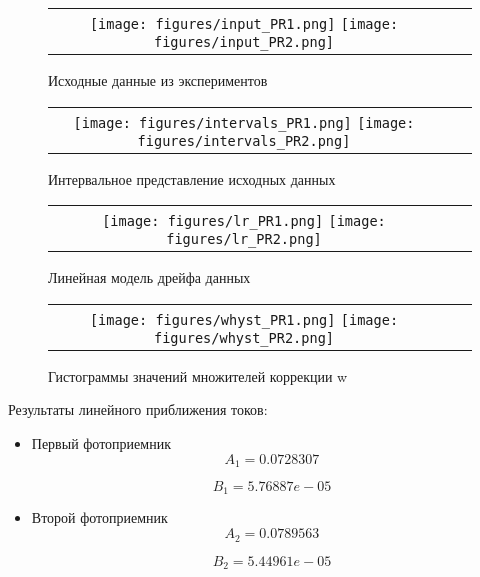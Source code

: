 \documentclass[../main.tex]{subfiles}
\begin{document}
\begin{figure}[H]
	\begin{tabular}{ccc}
		\texttt{[image: figures/input\_PR1.png]}
		\texttt{[image: figures/input\_PR2.png]}
	\end{tabular}
	\caption{Исходные данные из экспериментов} 
\end{figure}

\begin{figure}[H]
	\begin{tabular}{ccc}
		\texttt{[image: figures/intervals\_PR1.png]}
		\texttt{[image: figures/intervals\_PR2.png]}
	\end{tabular}
	\caption{Интервальное представление исходных данных} 
\end{figure}

\begin{figure}[H]
	\begin{tabular}{ccc}
		\texttt{[image: figures/lr\_PR1.png]}
		\texttt{[image: figures/lr\_PR2.png]}
	\end{tabular}
	\caption{Линейная модель дрейфа данных} 
\end{figure}

\begin{figure}[H]
	\begin{tabular}{ccc}
		\texttt{[image: figures/whyst\_PR1.png]}
		\texttt{[image: figures/whyst\_PR2.png]}
	\end{tabular}
	\caption{Гистограммы значений множителей коррекции w} 
\end{figure}

Результаты линейного приближения токов:
\begin{itemize}
\item Первый фотоприемник
        \begin{equation}
            A_1 = 0.0728307
        \end{equation}
        
        \begin{equation}
            B_1 = 5.76887e-05
        \end{equation}

\item Второй фотоприемник
        \begin{equation}
            A_2 = 0.0789563
        \end{equation}
        
        \begin{equation}
            B_2 = 5.44961e-05
        \end{equation}
\end{itemize}
\end{document}
